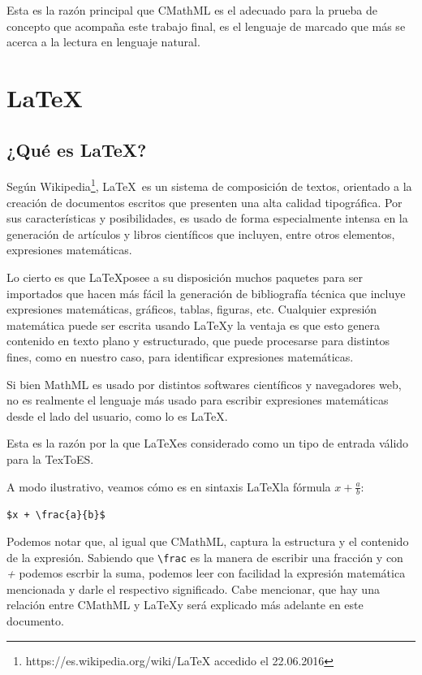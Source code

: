 Esta es la razón principal que CMathML es el adecuado para la prueba de concepto que acompaña este trabajo final, es el lenguaje de marcado
que más se acerca a la lectura en lenguaje natural.

\section{\LaTeX}

\subsection{¿Qué es \LaTeX ?}

Según Wikipedia\footnote{https://es.wikipedia.org/wiki/LaTeX accedido el 22.06.2016}, \LaTeX\ es un sistema de composición de textos, orientado a la creación de documentos escritos que
presenten una alta calidad tipográfica. Por sus características y posibilidades, es usado de forma especialmente intensa en la
generación de artículos y libros científicos que incluyen, entre otros elementos, expresiones matemáticas.

Lo cierto es que \LaTeX posee a su disposición muchos paquetes para ser importados que hacen más fácil la generación de bibliografía técnica que incluye expresiones matemáticas, gráficos, tablas, figuras, etc.
 Cualquier expresión matemática puede ser escrita usando \LaTeX y la ventaja es que esto genera contenido en texto plano y estructurado, que puede procesarse para distintos fines, como en nuestro caso, para identificar expresiones matemáticas.

Si bien MathML es usado por distintos softwares científicos y navegadores web, no es realmente el lenguaje más usado para escribir expresiones matemáticas desde
el lado del usuario, como lo es \LaTeX.

Esta es la razón por la que \LaTeX es considerado como un tipo de entrada válido para la TexToES.

A modo ilustrativo, veamos cómo es en sintaxis \LaTeX la fórmula $x + \frac{a}{b}$:

\verb|$x + \frac{a}{b}$|

Podemos notar que, al igual que CMathML, captura la estructura y el contenido de la expresión. Sabiendo que \verb|\frac| es la manera de escribir una fracción y con \textit{+} podemos escrbir la suma, podemos leer con facilidad la expresión matemática mencionada y darle el respectivo significado. Cabe mencionar, que hay una relación entre CMathML y \LaTeX y será explicado más adelante en este documento.

